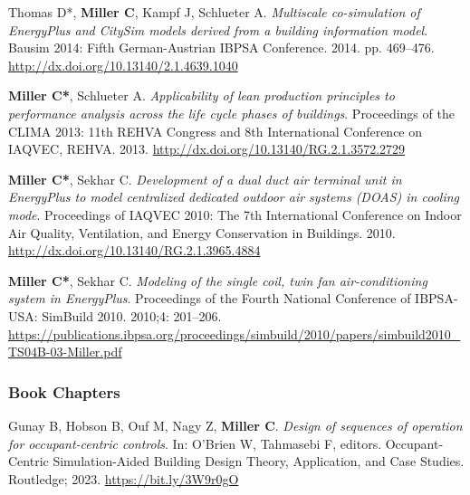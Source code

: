 \documentclass[10pt,a4paper]{article}
\begin{document}
\begin{small}
\begin{etaremune}
\item
Thomas D*, \textbf{Miller C}, Kampf J, Schlueter A. \emph{Multiscale co-simulation of EnergyPlus and CitySim models derived from a building information model}. Bausim 2014: Fifth German-Austrian IBPSA Conference. 2014. pp. 469–476. \url{http://dx.doi.org/10.13140/2.1.4639.1040}
\item
\textbf{Miller C*}, Schlueter A. \emph{Applicability of lean production principles to performance analysis across the life cycle phases of buildings}. Proceedings of the CLIMA 2013: 11th REHVA Congress and 8th International Conference on IAQVEC, REHVA. 2013. \url{http://dx.doi.org/10.13140/RG.2.1.3572.2729}
\item
\textbf{Miller C*}, Sekhar C. \emph{Development of a dual duct air terminal unit in EnergyPlus to model centralized dedicated outdoor air systems (DOAS) in cooling mode}. Proceedings of IAQVEC 2010: The 7th International Conference on Indoor Air Quality, Ventilation, and Energy Conservation in Buildings. 2010. \url{http://dx.doi.org/10.13140/RG.2.1.3965.4884}
\item
\textbf{Miller C*}, Sekhar C. \emph{Modeling of the single coil, twin fan air-conditioning system in EnergyPlus}. Proceedings of the Fourth National Conference of IBPSA-USA: SimBuild 2010. 2010;4: 201–206. \url{https://publications.ibpsa.org/proceedings/simbuild/2010/papers/simbuild2010_TS04B-03-Miller.pdf}

\end{etaremune}

\subsubsection*{Book Chapters}
\begin{etaremune}
\item
Gunay B, Hobson B, Ouf M, Nagy Z, \textbf{Miller C}. \emph{Design of sequences of operation for occupant-centric controls}. In: O’Brien W, Tahmasebi F, editors. Occupant-Centric Simulation-Aided Building Design Theory, Application, and Case Studies. Routledge; 2023. \url{https://bit.ly/3W9r0gO}
\end{etaremune}


\end{small}
\end{document}
